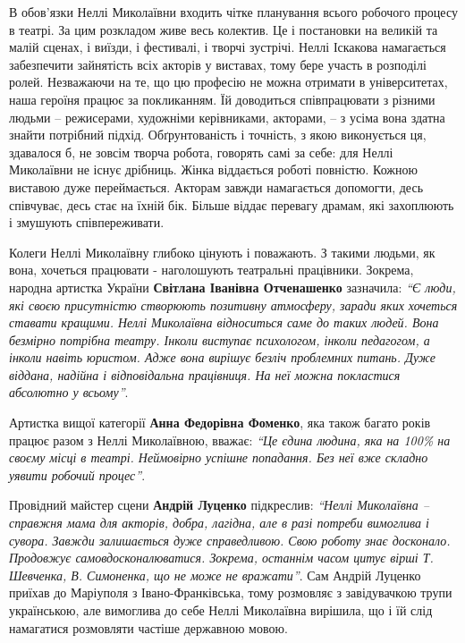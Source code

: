 В обов'язки Неллі Миколаївни входить чітке планування всього робочого процесу в
театрі. За цим розкладом живе весь колектив. Це і постановки на великій та
малій сценах, і виїзди, і фестивалі, і творчі зустрічі. Неллі Іскакова
намагається забезпечити зайнятість всіх акторів у виставах, тому бере участь в
розподілі ролей. Незважаючи на те, що цю професію не можна отримати в
університетах, наша героїня працює за покликанням. Їй доводиться співпрацювати
з різними людьми – режисерами, художніми керівниками, акторами, – з усіма вона
здатна знайти потрібний підхід. Обґрунтованість і точність, з якою виконується
ця, здавалося б, не зовсім творча робота, говорять самі за себе: для Неллі
Миколаївни не існує дрібниць. Жінка віддається роботі повністю. Кожною виставою
дуже переймається. Акторам завжди намагається допомогти, десь співчуває, десь
стає на їхній бік. Більше віддає перевагу драмам, які захоплюють і змушують
співпереживати.


Колеги Неллі Миколаївну глибоко цінують і поважають. З такими людьми, як вона,
хочеться працювати - наголошують театральні працівники. Зокрема, народна
артистка України \textbf{Світлана Іванівна Отченашенко} зазначила: \emph{\enquote{Є люди, які своєю
присутністю створюють позитивну атмосферу, заради яких хочеться ставати
кращими. Неллі Миколаївна відноситься саме до таких людей. Вона безмірно
потрібна театру. Інколи виступає психологом, інколи педагогом, а інколи навіть
юристом. Адже вона вирішує безліч проблемних питань. Дуже віддана, надійна і
відповідальна працівниця. На неї можна покластися абсолютно у всьому}}.

Артистка вищої категорії \textbf{Анна Федорівна Фоменко}, яка також багато років працює
разом з Неллі Миколаївною, вважає: \emph{\enquote{Це єдина людина, яка на 100\% на своєму
місці в театрі. Неймовірно успішне попадання. Без неї вже складно уявити
робочий процес}}.

Провідний майстер сцени \textbf{Андрій Луценко} підкреслив: \emph{\enquote{Неллі Миколаївна – справжня
мама для акторів, добра, лагідна, але в разі потреби вимоглива і сувора. Завжди
залишається дуже справедливою. Свою роботу знає досконало. Продовжує
самовдосконалюватися. Зокрема, останнім часом цитує вірші Т. Шевченка, В.
Симоненка, що не може не вражати}}. Сам Андрій Луценко приїхав до Маріуполя з
Івано-Франківська, тому розмовляє з завідувачкою трупи українською, але
вимоглива до себе Неллі Миколаївна вирішила, що і їй слід намагатися розмовляти
частіше державною мовою.

